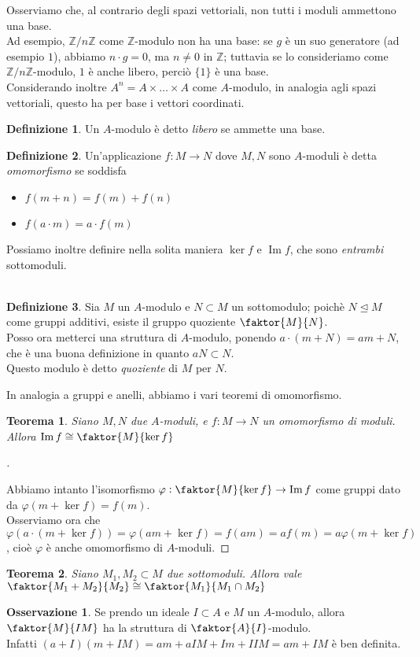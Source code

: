 \documentclass[a4paper,10pt]{article}
\theoremstyle{plain}
\newtheorem{thm}{Teorema}[section]
\theoremstyle{definition}
\newtheorem{defn}{Definizione}[section]
\newtheorem*{oss}{Osservazione}
\newenvironment{myproof}[1][\proofname]{%
  \begin{proof}[#1]$ $\par\nobreak\ignorespaces
}{%
  \qedhere
  \end{proof}
}
\DeclareMathOperator{\Imm}{Im}
\newcommand{\Z}{\mathbb{Z}}
\newcommand{\Zn}[1]{\Z/#1\Z}
\newcommand{\normal}{\mathrel{\unlhd}}
\begin{document}
Osserviamo che, al contrario degli spazi vettoriali, non tutti i moduli ammettono una base.\\
Ad esempio, $\Zn{n}$ come $\Z$-modulo non ha una base: se $g$ è un suo generatore (ad esempio $1$), abbiamo $n\cdot g=0$, ma $n\neq0$ in $\Z$; tuttavia se lo consideriamo come $\Zn{n}$-modulo, $1$ è anche libero, perciò $\{1\}$ è una base.\\
Considerando inoltre $A^n=A\times\dots\times A$ come $A$-modulo, in analogia agli spazi vettoriali, questo ha per base i vettori coordinati.\\
\begin{defn}
    Un $A$-modulo è detto \emph{libero} se ammette una base.
\end{defn}
\begin{defn}
    Un'applicazione $f:M\to N$ dove $M,N$ sono $A$-moduli è detta \emph{omomorfismo} se soddisfa
    \begin{itemize}
        \item $f(m+n)=f(m)+f(n)$
        \item $f(a\cdot m)=a\cdot f(m)$
    \end{itemize}
\end{defn}
Possiamo inoltre definire nella solita maniera $\ker f$ e $\Imm f$, che sono \emph{entrambi} sottomoduli.\\
\\
\begin{defn}
    Sia $M$ un $A$-modulo e $N\subset M$ un sottomodulo; poichè $N\normal M$ come gruppi additivi, esiste il gruppo quoziente $\faktor{M}{N}$.\\
    Posso ora metterci una struttura di $A$-modulo, ponendo $a\cdot(m+N)=am+N$, che è una buona definizione in quanto $aN\subset N$.\\
    Questo modulo è detto \emph{quoziente} di $M$ per $N$.
\end{defn}
In analogia a gruppi e anelli, abbiamo i vari teoremi di omomorfismo.
\begin{thm}
    Siano $M,N$ due $A$-moduli, e $f:M\to N$ un omomorfismo di moduli. Allora $\Imm f\cong \faktor{M}{\ker f}$
\end{thm}
\begin{myproof}
    Abbiamo intanto l'isomorfismo $\varphi: \faktor{M}{\ker f}\to \Imm f$ come gruppi dato da $\varphi(m+\ker f)=f(m)$.\\
    Osserviamo ora che $\varphi(a\cdot(m+\ker f))=\varphi(am+\ker f)=f(am)=af(m)=a\varphi(m+\ker f)$, cioè $\varphi$ è anche omomorfismo di $A$-moduli.
\end{myproof}
\begin{thm}
    Siano $M_1,M_2\subset M$ due sottomoduli. Allora vale $\faktor{M_1+M_2}{M_2}\cong\faktor{M_1}{M_1\cap M_2}$
\end{thm}
\begin{oss}
    Se prendo un ideale $I\subset A$ e $M$ un $A$-modulo, allora $\faktor{M}{IM}$ ha la struttura di $\faktor{A}{I}$-modulo.\\
    Infatti $(a+I)(m+IM)=am+aIM+Im+IIM=am+IM$ è ben definita.
\end{oss}
\end{document}
